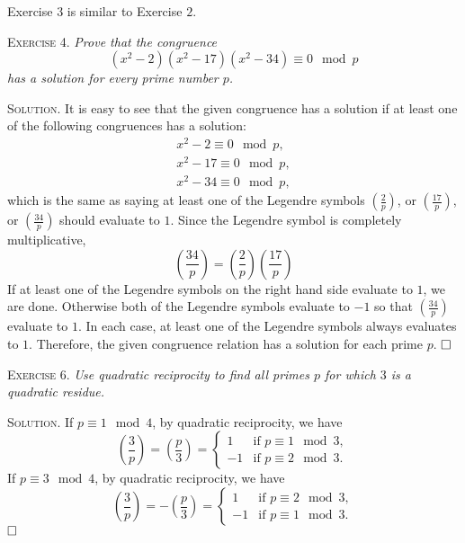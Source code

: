 \documentclass[11pt, leqno]{article}
\newcommand{\done}{\ensuremath{\hfill\square}}
\begin{document}
Exercise $3$ is similar to Exercise $2$.

\textsc{Exercise 4}. \emph{Prove that the congruence 
\begin{displaymath}
(x^2-2)(x^2-17)(x^2-34) \equiv 0 \mod p
\end{displaymath}
has a solution for every prime number $p$.}

\textsc{Solution}. It is easy to see that the given congruence has a solution if at least one of the following congruences has a solution: 
\begin{align*}
  x^2 - 2 \equiv  0 \mod p, \\
  x^2 - 17 \equiv 0 \mod p, \\
  x^2 - 34 \equiv 0 \mod p,
\end{align*}
which is the same as saying at least one of the Legendre symbols $\left( \frac{2}{p} \right)$, or $\left( \frac{17}{p} \right)$, or $\left( \frac{34}{p} \right)$ should evaluate to $1$. Since the Legendre symbol is completely multiplicative, 
\begin{displaymath}
\left( \frac{34}{p} \right) = \left( \frac{2}{p} \right) \left( \frac{17}{p} \right)
\end{displaymath}
If at least one of the Legendre symbols on the right hand side evaluate to $1$, we are done. Otherwise both of the Legendre symbols evaluate to $-1$ so that $\left( \frac{34}{p} \right)$ evaluate to $1$. In each case, at least one of the Legendre symbols always evaluates to $1$. Therefore, the given congruence relation has a solution for each prime $p$. \done

\textsc{Exercise 6}. \emph{Use quadratic reciprocity to find all primes $p$ for which $3$ is a quadratic residue.}

\textsc{Solution}. If $p \equiv 1 \mod 4$, by quadratic reciprocity, we have 
\begin{displaymath}
\left( \frac{3}{p} \right) = \left( \frac{p}{3} \right) =
\begin{cases}
  1 & \text{if } p \equiv 1 \mod 3,\\
  -1 & \text{if } p \equiv 2 \mod 3.\
\end{cases}
\end{displaymath}
If $p \equiv 3 \mod 4$, by quadratic reciprocity, we have 
\begin{displaymath}
\left( \frac{3}{p} \right) = -\left( \frac{p}{3} \right) =
\begin{cases}
  1 & \text{if } p \equiv 2 \mod 3,\\
  -1 & \text{if } p \equiv 1 \mod 3.
\end{cases}
\end{displaymath}
\done
\end{document}
